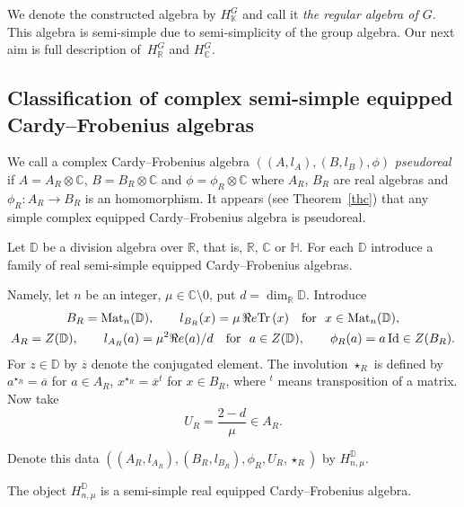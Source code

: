 \documentclass[pdftex]{sigma}
\newcommand{\tr}{\mathop{\sf tr}\nolimits}
\def \R {{\mathbb R}}
\def \C {{\mathbb C}}
\def \H {{\mathbb H}}
\def \tr {{\rm Tr}\,}
\def \mat {{\rm Mat}}
\def \id {{\rm Id}}
\def \re {{\Re e}}
\begin{document}
We denote the constructed algebra by  $H_{\mathbb{K}}^G$ and call it {\em the regular algebra of $G$}.
This algebra is semi-simple due to semi-simplicity of the group algebra.
Our next aim is full description of~$H^G_\mathbb{R}$ and
$H^G_\mathbb{C}$.

\subsection[Classification of complex semi-simple equipped Cardy-Frobenius algebras]{Classif\/ication of complex semi-simple equipped\\ Cardy--Frobenius algebras}

We call a complex Cardy--Frobenius
algebra $((A,l_A),(B,l_B),\phi)$
\textit{pseudoreal} if $A=A_R\otimes\mathbb{C}$, $B=B_R\otimes\mathbb{C}$ and $\phi=\phi_R\otimes\mathbb{C}$ where $A_R$, $B_R$ are real algebras and $\phi_R:A_R\rightarrow B_R$ is an homomorphism.
It appears (see Theorem~\ref{thc}) that any
simple  complex equipped  Cardy--Frobenius
algebra is pseudoreal.

Let $\mathbb{D}$ be a division algebra over $\R$, that is, $\R$, $\C$ or
$\H$. For each $\mathbb{D}$ introduce a family of real semi-simple equipped Cardy--Frobenius algebras.

Namely, let $n$ be an integer, $\mu \in \C\setminus 0$, put $d = \dim_\R \mathbb{D}$.
Introduce{\samepage
\begin{gather*}
B_R = \mat_n(\mathbb{D}),  \qquad l_{B_R}(x)  = \mu  \, \re \tr (x)  \quad  \mbox{for}\ \ x \in \mat_n(\mathbb{D}),\\
A_R = Z(\mathbb{D}),  \qquad    l_{A_R}(a)  = \mu^2 \re (a)/d      \quad \mbox{for}\  \ a \in Z(\mathbb{D}), \qquad \phi_R(a) = a \,\id \in Z(B_R).
\end{gather*}
For} $z \in \mathbb{D}$ by $\overline{z}$ denote the conjugated element.
The involution $\star_R$ is def\/ined by $a^{\star_R} = \overline{a}$
for $a \in A_R$,
$x^{\star_R} = \overline{x}^t$
for $x \in B_R$, where ${}^t$ means transposition of a matrix.
Now take
\begin{equation}\label{defu}
U_R = \frac{2-d}{\mu} \in A_R.
\end{equation}

Denote this data $((A_R,l_{A_R}),(B_R,l_{B_R}),\phi_R,U_R,\star_R)$ by $H^\mathbb{D}_{n,\mu}$.

\begin{proposition}
The object $H^\mathbb{D}_{n,\mu}$ is a semi-simple real equipped Cardy--Frobenius
algebra.
\end{proposition}
\end{document}
